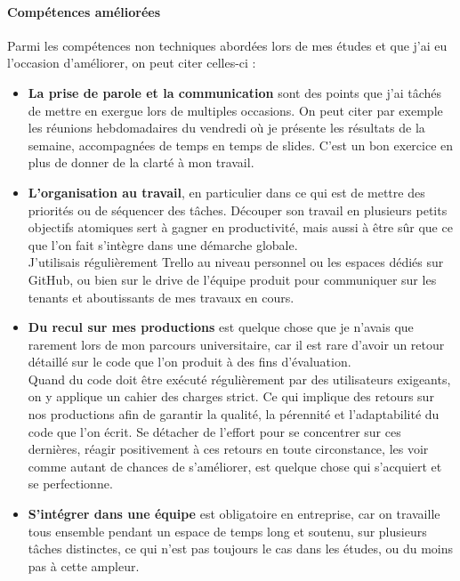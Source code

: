 \documentclass{rapportCS}
\begin{document}
\paragraph{Compétences améliorées}
Parmi les compétences non techniques abordées lors de mes études et que j'ai eu l'occasion
d'améliorer, on peut citer celles-ci :
\begin{itemize}
  \item \textbf{La prise de parole et la communication} sont des points que j'ai tâchés
  de mettre en exergue lors de multiples occasions. On peut citer par exemple
  les réunions hebdomadaires du vendredi où je présente les résultats de la semaine,
  accompagnées de temps en temps de slides. C'est un bon exercice en plus de 
  donner de la clarté à mon travail.
  \item \textbf{L'organisation au travail}, en particulier dans ce qui est
  de mettre des priorités ou de séquencer des tâches. Découper son travail en
  plusieurs petits objectifs atomiques sert à gagner en productivité, mais aussi
  à être sûr que ce que l'on fait s'intègre dans une démarche globale.\\
  J'utilisais régulièrement Trello au niveau personnel ou les espaces dédiés
  sur GitHub, ou bien sur le drive de l'équipe produit 
  pour communiquer sur les tenants et aboutissants de mes travaux en cours.
  \item \textbf{Du recul sur mes productions} est quelque chose que je n'avais que
  rarement lors de mon parcours universitaire, car il est rare d'avoir
  un retour détaillé sur le code que l'on produit à des fins d'évaluation.\\
  Quand du code doit être exécuté régulièrement par des utilisateurs exigeants,
  on y applique un cahier des charges strict. Ce qui implique des retours sur nos
  productions afin de garantir la qualité, la pérennité et l'adaptabilité du code que l'on
  écrit. Se détacher de l'effort pour se concentrer sur ces dernières, 
  réagir positivement à ces retours en toute circonstance, les voir comme autant de chances
  de s'améliorer, est quelque chose qui s'acquiert et se perfectionne.
  \item \textbf{S'intégrer dans une équipe} est obligatoire en entreprise, car on travaille
  tous ensemble pendant un espace de temps long et soutenu, sur plusieurs tâches distinctes,
  ce qui n'est pas toujours le cas dans les études, ou du moins pas à cette ampleur. 
\end{itemize}
\end{document}
